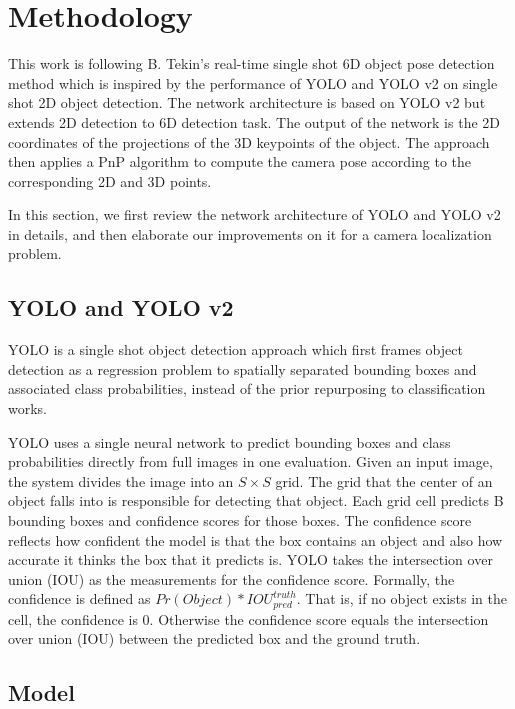 \chapter{Methodology}

This work is following B. Tekin's real-time single shot 6D object pose detection method \cite{tekin2018real} which is inspired by the performance of YOLO and YOLO v2 on single shot 2D object detection. The network architecture is based on YOLO v2  but extends 2D detection to 6D detection task. The output of the network is the 2D coordinates of the projections of the 3D keypoints of the object. The approach then applies a PnP algorithm to compute the camera pose according to the corresponding 2D and 3D points.

In this section, we first review the network architecture of YOLO and YOLO v2 in details, and then elaborate our improvements on it for a camera localization problem.

\section{YOLO and YOLO v2}

YOLO \cite{redmon2016you} is a single shot object detection approach which first frames object detection as a regression problem to spatially separated bounding boxes and associated class probabilities, instead of the prior repurposing to classification works.

YOLO uses a single neural network to predict bounding boxes and class probabilities directly from full images in one evaluation. Given an input image, the system divides the image into an $S \times S$ grid. The grid that the center of an object falls into is responsible for detecting that object. Each grid cell predicts B bounding boxes and confidence scores for those boxes. The confidence score reflects how confident the model is that the box contains an object and also how accurate it thinks the box that it predicts is. YOLO takes the intersection over union (IOU) as the measurements for the confidence score. Formally, the confidence is defined as $Pr(Object) * IOU_{pred}^{truth}$. That is, if no object exists in the cell, the confidence is 0. Otherwise the confidence score equals the intersection over union (IOU) between the predicted box and the ground truth.



\section{Model}
